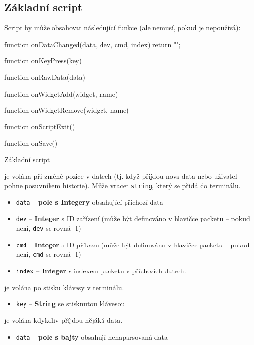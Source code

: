 \documentclass[12pt, a4paper, oneside]{article}
\begin{document}
\subsection*{Základní script}
Script by může obsahovat následující funkce (ale nemusí, pokud je nepoužívá):
\begin{listing}[H]
\begin{jscode}
function onDataChanged(data, dev, cmd, index) {
    return "";
}

function onKeyPress(key) {
}

function onRawData(data) {
}

function onWidgetAdd(widget, name) {
}

function onWidgetRemove(widget, name) {
}

function onScriptExit() {
}

function onSave() {
}
\end{jscode}
\caption{Základní script}
\label{input_script}
\end{listing}

 je volána při změně pozice v datech (tj. když přijdou nová data nebo uživatel pohne posuvníkem historie). Může vracet \verb/string/, který se přidá do terminálu.

\begin{itemize}
    \item \verb/data/ -- {\bf pole s Integery} obsahující příchozí data
    \item \verb/dev/ -- {\bf Integer} s ID zařízení (může být definováno v hlavičce packetu -- pokud není, \verb/dev/ se rovná -1)
    \item \verb/cmd/ -- {\bf Integer} s ID příkazu (může být definováno v hlavičce packetu -- pokud není, \verb/cmd/ se rovná -1)
    \item \verb/index/ -- {\bf Integer} s indexem packetu v příchozích datech.
\end{itemize}

 je volána po stisku klávesy v terminálu.
\begin{itemize}
    \item \verb/key/ -- {\bf String} se stisknutou klávesou
\end{itemize}

 je volána kdykoliv příjdou nějáká data.
\begin{itemize}
    \item \verb/data/ -- {\bf pole s bajty} obsahují nenaparsovaná data
\end{itemize}
\end{document}
